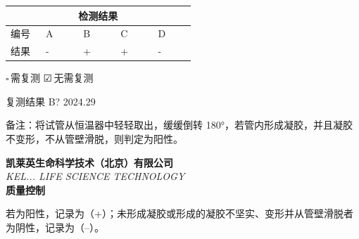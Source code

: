 \documentclass[UTF8,10pt,a4paper,fontset=fandol]{ctexart}
\newcommand{\fieldvalue}[1]{#1}
\newcommand{\handwritten}[1]{#1}
\newcommand{\checkboxfield}[1]{\ifstrequal{#1}{checked}{☑}{\ifstrequal{#1}{unclear}{?}{☐}}}
\begin{document}
\begin{center}
\begin{tabular}{|p{0.16\linewidth}|p{0.17\linewidth}|p{0.17\linewidth}|p{0.17\linewidth}|p{0.17\linewidth}|}
\hline
\multicolumn{5}{|c|}{检测结果}\\
\hline
编号 & A & B & C & D\\
\hline
结果 &
\fieldvalue{\handwritten{-}} &
\fieldvalue{\handwritten{+}} &
\fieldvalue{\handwritten{+}} &
\fieldvalue{\handwritten{-}}\\
\hline
\end{tabular}
\end{center}

\noindent
$\square$\,需复测
\qquad
\fieldvalue{\handwritten{\checkboxfield{checked}}}\,无需复测

\medskip

\noindent
复测结果\quad
\fieldvalue{\handwritten{B? 2024.29}}

\medskip

\noindent
备注：将试管从恒温器中轻轻取出，缓缓倒转 180°，若管内形成凝胶，并且凝胶不变形，不从管壁滑脱，则判定为阳性。


\newpage

\begin{center}
\textbf{凯莱英生命科学技术（北京）有限公司}\\
\textit{KEL... LIFE SCIENCE TECHNOLOGY}\\[0.5em]
\textbf{质量控制}
\end{center}

\noindent
若为阳性，记录为（+）；未形成凝胶或形成的凝胶不坚实、变形并从管壁滑脱者为阴性，记录为（--）。

\vspace{0.5em}
\end{document}
